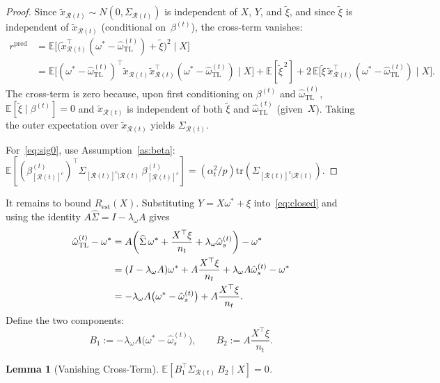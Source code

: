\documentclass[11pt]{article}
\newtheorem{lemma}[theorem]{Lemma}
\theoremstyle{definition}
\newcommand{\Rt}{\mathcal{R}(t)}
\newcommand{\Rtc}{[\mathcal{R}(t)]^c}
\newcommand{\SigR}{\Sigma_{\Rt}}
\newcommand{\SigSchur}{\Sigma_{\Rtc|\Rt}}
\newcommand{\hSig}{\widehat{\Sigma}}
\newcommand{\ohat}{\hat{\omega}}
\newcommand{\E}{\mathbb{E}}
\newcommand{\tr}{\mathrm{tr}}
\begin{document}
\begin{proof}
Since $\tilde x_{\Rt}\sim N(0,\SigR)$ is independent of
$X$, $Y$, and $\tilde\xi$, and since $\tilde\xi$ is independent of
$\tilde x_{\Rt}$ (conditional on~$\beta^{(t)}$), the cross-term
vanishes:
\begin{align*}
  r^{\mathrm{pred}}
  &=\E\!\bigl[
    \bigl(\tilde x_{\Rt}^\top(\omega^*-\ohat_{\mathrm{TL}}^{(t)})
          +\tilde\xi\bigr)^2
    \;\big|\;X\bigr]\\
  &=\E\!\bigl[
    (\omega^*-\ohat_{\mathrm{TL}}^{(t)})^\top
    \tilde x_{\Rt}\tilde x_{\Rt}^\top
    (\omega^*-\ohat_{\mathrm{TL}}^{(t)})
    \;\big|\;X\bigr]
    +\E[\tilde\xi^{\,2}]
    +2\,\E\!\bigl[
      \tilde\xi\,
      \tilde x_{\Rt}^\top(\omega^*-\ohat_{\mathrm{TL}}^{(t)})
    \;\big|\;X\bigr].
\end{align*}
The cross-term is zero because, upon first conditioning on
$\beta^{(t)}$ and $\ohat_{\mathrm{TL}}^{(t)}$,
$\E[\tilde\xi\mid\beta^{(t)}]=0$ and
$\tilde x_{\Rt}$ is independent of both $\tilde\xi$ and
$\ohat_{\mathrm{TL}}^{(t)}$ (given~$X$).  Taking the outer expectation
over $\tilde x_{\Rt}$ yields $\SigR$.
 
For~\eqref{eq:sig0}, use Assumption~\ref{as:beta}:
$\E[(\beta^{(t)}_{\Rtc})^\top\SigSchur\,\beta^{(t)}_{\Rtc}]
=(\alpha_t^2/p)\tr(\SigSchur)$.
\end{proof}
 
It remains to bound $R_{\mathrm{est}}(X)$.  Substituting $Y=X\omega^*+\xi$
into~\eqref{eq:closed} and using the identity
$A\hSig=I-\lambda_\omega A$ gives
\begin{align}
  \ohat_{\mathrm{TL}}^{(t)}-\omega^*
  &=A\!\left(\hSig\,\omega^*
    +\frac{X^\top\xi}{n_t}
    +\lambda_\omega\ohat_s^{(t)}\right)-\omega^*
  \notag\\
  &=(I-\lambda_\omega A)\omega^*
    +A\frac{X^\top\xi}{n_t}
    +\lambda_\omega A\ohat_s^{(t)}
    -\omega^*
  \notag\\
  &=-\lambda_\omega A\bigl(\omega^*-\ohat_s^{(t)}\bigr)
    +A\frac{X^\top\xi}{n_t}.
  \label{eq:delta}
\end{align}
Define the two components:
\begin{equation}\label{eq:B1B2}
  B_1:=-\lambda_\omega A\bigl(\omega^*-\ohat_s^{(t)}\bigr),
  \qquad
  B_2:=A\frac{X^\top\xi}{n_t}.
\end{equation}
 
\begin{lemma}[Vanishing Cross-Term]\label{lem:cross}
$\E[B_1^\top\SigR\,B_2\mid X]=0$.
\end{lemma}
 
\end{document}
